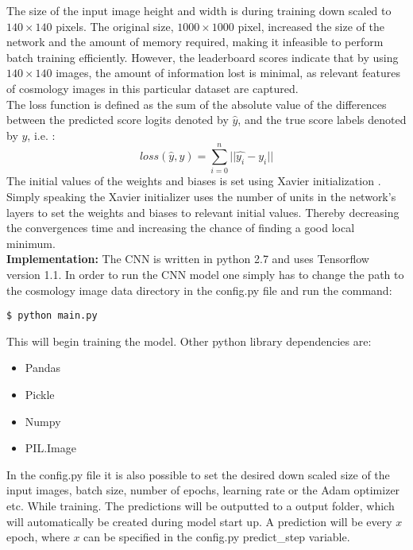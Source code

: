 \documentclass[journal]{IEEEtran}
\begin{document}
The size of the input image height and width is during training down scaled to $140\times140$ pixels. The original size, $1000\times1000$ pixel, increased the size of the network and the amount of memory required, making it infeasible to perform batch training efficiently. However, the leaderboard scores indicate that by using $140\times140$ images, the amount of information lost is minimal, as relevant features of cosmology images in this particular dataset are captured. 
\hfill\\
The loss function is defined as the sum of the absolute value of the differences between the predicted score logits denoted by $\hat{y}$, and the true score labels denoted by $y$, i.e. :
\[ loss(\hat{y},y) = \sum_{i=0}^{n} ||\hat{y_i} - y_i|| \]
The initial values of the weights and biases is set using Xavier initialization \cite{xavier-initialization}. Simply speaking the Xavier initializer uses the number of units in the network's layers to set the weights and biases to relevant initial values. Thereby decreasing the convergences time and increasing the chance of finding a good local minimum.
\hfill\\
\textbf{Implementation:}
The CNN is written in python 2.7 and uses Tensorflow version 1.1. In order to run the CNN model one simply has to change the path to the cosmology image data directory in the config.py file and run the command:
\noindent
\begin{verbatim}
$ python main.py
\end{verbatim}
This will begin training the model. Other python library dependencies are: 
\begin{itemize}
\item Pandas
\item Pickle
\item Numpy 
\item PIL.Image
\end{itemize} 
In the config.py file it is also possible to set the desired down scaled size of the input images, batch size, number of epochs, learning rate or the Adam optimizer etc. While training. The predictions will be outputted to a output folder, which will automatically be created during model start up. A prediction will be every $x$ epoch, where $x$ can be specified in the config.py predict\_step variable. 
\end{document}
